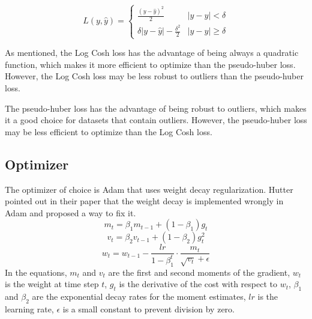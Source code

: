 \begin{equation}
L(y, \hat{y}) = \begin{cases}
    \frac{(y - \hat{y})^2}{2} & |y - \hat{y}| < \delta \\
    \delta |y - \hat{y}| - \frac{\delta^2}{2} & |y - \hat{y}| \ge \delta
    \end{cases}
\end{equation}

As mentioned, the Log Cosh loss has the advantage of being always a quadratic function, which makes it more efficient to optimize than the pseudo-huber loss. However, the Log Cosh loss may be less robust to outliers than the pseudo-huber loss.

The pseudo-huber loss has the advantage of being robust to outliers, which makes it a good choice for datasets that contain outliers. However, the pseudo-huber loss may be less efficient to optimize than the Log Cosh loss.

\subsection{Optimizer}
\label{subsec:optimizer}

The optimizer of choice is Adam \cite{kingma2017adam} that uses weight decay regularization.
Hutter pointed out in their paper \cite{loshchilov2019decoupled} that the weight decay is implemented wrongly in Adam and proposed a way to fix it.
\begin{equation}
\label{eq:first_moment}
m_t = \beta_1 m_{t-1} + (1 - \beta_1) g_t
\end{equation}
\begin{equation}
\label{eq:second_moment}
v_t = \beta_2 v_{t-1} + (1 - \beta_2) g_t^2
\end{equation}
\begin{equation}
\label{eq:weight_update}
w_t = w_{t-1} - \frac{lr}{1 - \beta_1^t} \cdot \frac{m_t}{\sqrt{v_t} + \epsilon}
\end{equation}
In the equations, $m_t$ and $v_t$ are the first and second moments of the gradient, $w_t$ is the weight at time step $t$, $g_t$ is the derivative of the cost with respect to $w_t$, $\beta_1$ and $\beta_2$ are the exponential decay rates for the moment estimates, $lr$ is the learning rate, $\epsilon$ is a small constant to prevent division by zero.